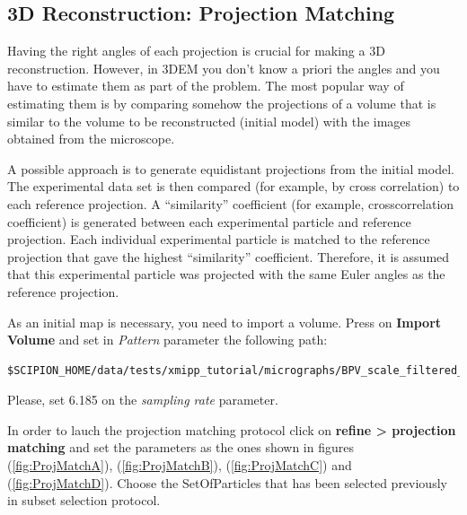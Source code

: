 \documentclass[12pt]{article} %
\begin{document}
\subsection{3D Reconstruction: Projection Matching}

Having the right angles of each projection is crucial for making a 3D
reconstruction.  However, in 3DEM you don’t know a priori the angles
and you have to estimate them as part of the problem. The most popular
way of estimating them is by comparing somehow the projections of a
volume that is similar to the volume to be reconstructed (initial
model) with the images obtained from the microscope.

A possible approach is to generate equidistant projections from the
initial model. The experimental data set is then compared (for
example, by cross correlation) to each reference projection.  A
“similarity” coefficient (for example, crosscorrelation coefficient)
is generated between each experimental particle and reference
projection. Each individual experimental particle is matched to the
reference projection that gave the highest “similarity”
coefficient. Therefore, it is assumed that this experimental particle
was projected with the same Euler angles as the reference projection.

As an initial map is necessary, you need to import a volume. Press on
\textbf{Import Volume} and set in \textit{Pattern} parameter the
following path:




\begin{verbatim}
$SCIPION_HOME/data/tests/xmipp_tutorial/micrographs/BPV_scale_filtered_windowed_110.vol
\end{verbatim}

Please, set 6.185 on the \textit{sampling rate} parameter.

In order to lauch the projection matching protocol click on
\textbf{refine > projection matching} and set the parameters as the
ones shown in figures (\ref{fig:ProjMatchA}), (\ref{fig:ProjMatchB}),
(\ref{fig:ProjMatchC}) and (\ref{fig:ProjMatchD}). Choose the
SetOfParticles that has been selected previously in subset selection
protocol.
\end{document}
